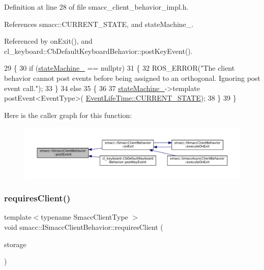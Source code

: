 Definition at line 28 of file smacc\+\_\+client\+\_\+behavior\+\_\+impl.\+h.



References smacc\+::\+C\+U\+R\+R\+E\+N\+T\+\_\+\+S\+T\+A\+TE, and state\+Machine\+\_\+.



Referenced by on\+Exit(), and cl\+\_\+keyboard\+::\+Cb\+Default\+Keyboard\+Behavior\+::post\+Key\+Event().


\begin{DoxyCode}
29 \{
30     \textcolor{keywordflow}{if} (\hyperlink{classsmacc_1_1ISmaccClientBehavior_a0fea65db292a8bb3dfba3e5840491d79}{stateMachine\_} == \textcolor{keyword}{nullptr})
31     \{
32         ROS\_ERROR(\textcolor{stringliteral}{"The client behavior cannot post events before being assigned to an orthogonal. Ignoring
       post event call."});
33     \}
34     \textcolor{keywordflow}{else}
35     \{
36          
37         \hyperlink{classsmacc_1_1ISmaccClientBehavior_a0fea65db292a8bb3dfba3e5840491d79}{stateMachine\_}->template postEvent<EventType>(
      \hyperlink{namespacesmacc_a5063f47926ad2fe25120ed4b1e7b2c7ea49b599d413671f16f08d0dd18243c294}{EventLifeTime::CURRENT\_STATE});
38     \}
39 \}
\end{DoxyCode}
Here is the caller graph for this function\+:
\nopagebreak
\begin{figure}[H]
\begin{center}
\leavevmode
\includegraphics[width=350pt]{classsmacc_1_1ISmaccClientBehavior_a5db577c585935114058770f2b7242f8a_icgraph}
\end{center}
\end{figure}
\mbox{\label{classsmacc_1_1ISmaccClientBehavior_a32b16e99e3b4cb289414203dc861a440}} 
\subsubsection{\texorpdfstring{requires\+Client()}{requiresClient()}}
{\footnotesize\ttfamily template$<$typename Smacc\+Client\+Type $>$ \\
void smacc\+::\+I\+Smacc\+Client\+Behavior\+::requires\+Client (\begin{DoxyParamCaption}\item[{Smacc\+Client\+Type $\ast$\&}]{storage }\end{DoxyParamCaption})}



